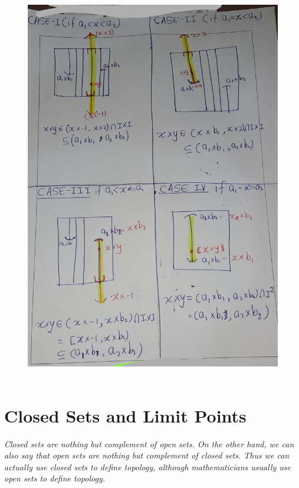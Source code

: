 \documentclass[
]{book}
\theoremstyle{definition}
\theoremstyle{definition}
\theoremstyle{definition}
\theoremstyle{definition}
\theoremstyle{remark}
\begin{document}
\begin{figure}
\centering
\includegraphics{figures/figure 15.jpg}
\caption{\label{fig:fig15}\(~\)}
\end{figure}

\hypertarget{closed-sets-and-limit-points}{%
\section{Closed Sets and Limit Points}\label{closed-sets-and-limit-points}}

\emph{Closed sets are nothing but complement of open sets. On the other hand, we can also say that open sets are nothing but
complement of closed sets. Thus we can actually use closed sets to define topology, although mathematicians usually use
open sets to define topology.}
\end{document}
